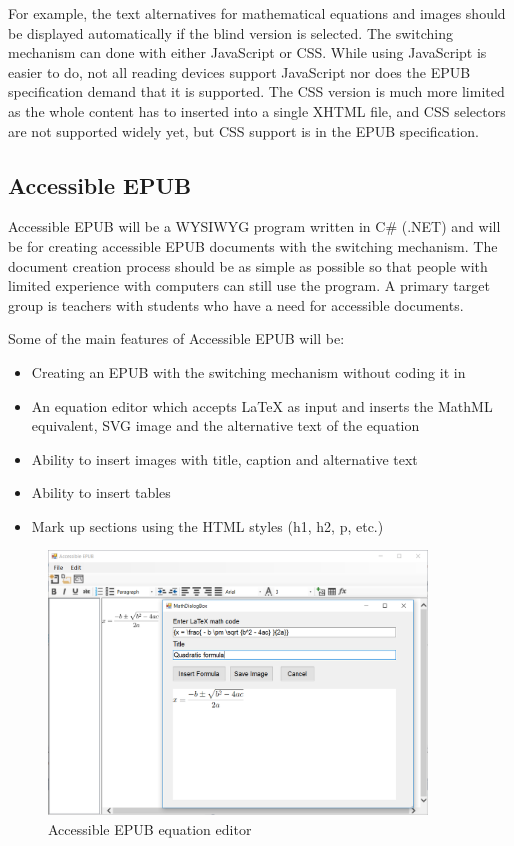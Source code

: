 \documentclass{llncs}
\begin{document}
For example, the text alternatives for mathematical equations and images should be displayed automatically if the blind version is selected.\cite{EPUB3bp} The switching mechanism can done with either JavaScript or CSS. While using JavaScript is easier to do, not all reading devices support JavaScript nor does the EPUB specification demand that it is supported. \cite{EPUB3bp} The CSS version is much more limited as the whole content has to inserted into a single XHTML file, and CSS selectors are not supported widely yet, but CSS support is in the EPUB specification.

\subsection{Accessible EPUB}
Accessible EPUB will be a WYSIWYG program written in C\# (.NET) and will be for creating accessible EPUB documents with the switching mechanism. The document creation process should be as simple as possible so that people with limited experience with computers can still use the program. A primary target group is teachers with students who have a need for accessible documents.

Some of the main features of Accessible EPUB will be:
\begin{itemize}
	\item Creating an EPUB with the switching mechanism without coding it in
	\item An equation editor which accepts LaTeX as input and inserts the MathML equivalent, SVG image and the alternative text of the equation
	\item Ability to insert images with title, caption and alternative text
	\item Ability to insert tables
	\item Mark up sections using the HTML styles (h1, h2, p, etc.)
\end{itemize}

\begin{figure}
	\centering
	\includegraphics[height=70mm]{AccessibleEPUBequation.png}
	\caption{Accessible EPUB equation editor}
\end{figure}
\end{document}
